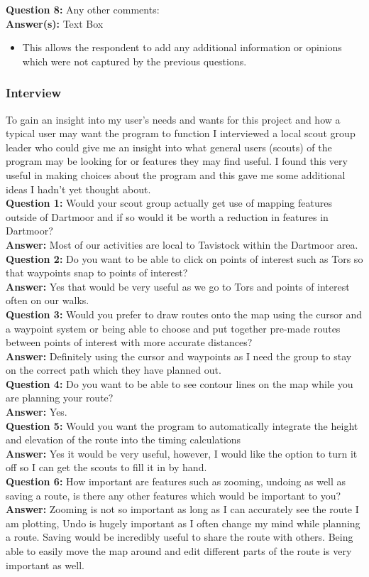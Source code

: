 \documentclass{article}
\newcommand{\QAnalysis}[4]{
    \noindent \textbf{Question #1: } #2 \\
    \noindent \textbf{Answer(s): } #3
    \begin{itemize}
        \item #4
    \end{itemize}
}
\newcommand{\InterviewQuestion}[3]{
    \noindent \textbf{Question #1: } #2 \\
    \noindent \textbf{Answer: } #3 \\
}
\begin{document}
            \QAnalysis{8}{Any other comments:}{Text Box}{This allows the respondent to add any additional information or opinions which were not captured by the previous questions.}

        \subsubsection{Interview}

            To gain an insight into my user's needs and wants for this project and how a typical user may want the program to function I interviewed a local scout group leader who could give me an insight into what general users (scouts) of the program may be looking for or features they may find useful. I found this very useful in making choices about the program and this gave me some additional ideas I hadn't yet thought about. \\

            \InterviewQuestion{1}{Would your scout group actually get use of mapping features outside of Dartmoor and if so would it be worth a reduction in features in Dartmoor?}{Most of our activities are local to Tavistock within the Dartmoor area.}

            \InterviewQuestion{2}{Do you want to be able to click on points of interest such as Tors so that waypoints snap to points of interest?}{Yes that would be very useful as we go to Tors and points of interest often on our walks.}

            \InterviewQuestion{3}{Would you prefer to draw routes onto the map using the cursor and a waypoint system or being able to choose and put together pre-made routes between points of interest with more accurate distances?}{Definitely using the cursor and waypoints as I need the group to stay on the correct path which they have planned out.}

            \InterviewQuestion{4}{Do you want to be able to see contour lines on the map while you are planning your route?}{Yes.}

            \InterviewQuestion{5}{Would you want the program to automatically integrate the height and elevation of the route into the timing calculations}{Yes it would be very useful, however, I would like the option to turn it off so I can get the scouts to fill it in by hand.}

            \InterviewQuestion{6}{How important are features such as zooming, undoing as well as saving a route, is there any other features which would be important to you?}{Zooming is not so important as long as I can accurately see the route I am plotting, Undo is hugely important as I often change my mind while planning a route. Saving would be incredibly useful to share the route with others. Being able to easily move the map around and edit different parts of the route is very important as well.}
\end{document}
